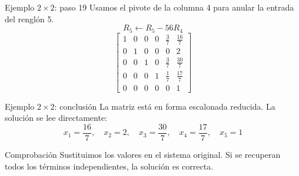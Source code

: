 \documentclass[aspectratio=169,9pt]{beamer}
\theoremstyle{remark}
\begin{document}
\begin{frame}[t]{Ejemplo $2\times2$: paso 19}
Usamos el pivote de la columna 4 para anular la entrada del renglón 5.
\[
R_{5}\leftarrow R_{5}-56R_{4}
\]
\[
\left[\begin{array}{ccccc|c}
1 & 0 & 0 & 0 & \frac{3}{7} & \frac{16}{7}\\
0 & 1 & 0 & 0 & 0 & 2\\
0 & 0 & 1 & 0 & \frac{3}{7} & \frac{30}{7}\\
0 & 0 & 0 & 1 & \frac{1}{7} & \frac{17}{7}\\
0 & 0 & 0 & 0 & 0 & 1
\end{array}\right]
\]
\end{frame}
\begin{frame}[t]{Ejemplo $2\times2$: conclusión}
La matriz está en forma escalonada reducida. La solución se lee directamente:
\[
\boxed{x_{1}=\frac{16}{7},\quad x_{2}=2,\quad x_{3}=\frac{30}{7},\quad x_{4}=\frac{17}{7},\quad x_{5}=1}
\]
\begin{block}{Comprobación}
Sustituimos los valores en el sistema original. Si se recuperan todos los términos independientes, la solución es correcta.
\end{block}
\end{frame}
\end{document}
